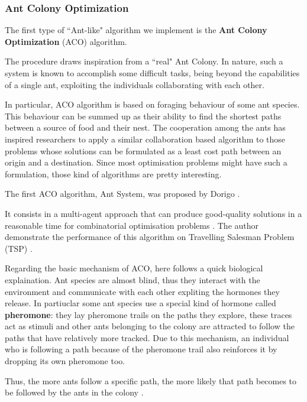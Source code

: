 \documentclass[10pt]{article}
\begin{document}
\subsubsection{Ant Colony Optimization} \label{sec:aco}
The first type of ``Ant-like" algorithm we implement is the \textbf{Ant Colony Optimization} (ACO) algorithm.

The procedure draws inspiration from a ``real"  Ant  Colony. 
In nature, such a system is  known  to  accomplish  some  difficult  tasks,  being beyond  the capabilities  of  a  single  ant,  exploiting the individuals collaborating  with  each  other.  

In particular, ACO algorithm  is based on  foraging  behaviour  of  some  ant species.  
This behaviour  can  be  summed up as  their  ability  to  find  the  shortest  paths between  a source of food  and  their  nest.
The cooperation  among  the  ants  has inspired researchers to apply a similar collaboration based algorithm to those problems whose   solutions   can   be formulated as a least cost path between an origin and a destination.
Since most optimisation problems  might have such a formulation,  those kind of algorithms are  pretty interesting.

The first ACO algorithm, Ant System, was proposed by Dorigo \cite{cinque, sei, sette, otto, nove}.

It consists in a multi-agent approach that can produce good-quality solutions in a reasonable time for combinatorial optimisation problems \cite{cinque}. 
The author demonstrate the performance of this algorithm on Travelling Salesman  Problem  (TSP) \cite{sei}. 

Regarding the basic mechanism of ACO, here follows a quick biological explaination.
Ant species are almost blind, thus they interact with the environment and communicate with each  other  expliting the hormones  they  release.  
In partiuclar some  ant  species use a special kind of hormone called \textbf{pheromone}: they lay pheromone trails on the paths they explore, these traces act as stimuli and other ants belonging to the colony are attracted to follow  the  paths  that  have  relatively  more  tracked.  
Due to this mechanism, an individual who is following a  path  because of the  pheromone  trail  also reinforces  it  by  dropping its  own pheromone  too.  

Thus, the  more ants  follow  a  specific  path,  the  more  likely  that  path  becomes  to  be  followed  by  the  ants  in the colony \cite{ cinque,otto, nove}.  
\end{document}
